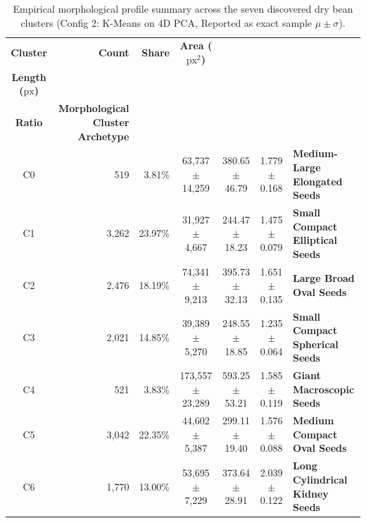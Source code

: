 \documentclass[10pt,onecolumn,letterpaper]{article}
\begin{document}
\begin{table}[htbp]
\centering
\footnotesize
\setlength{\tabcolsep}{3.5pt}
\renewcommand{\arraystretch}{1.1}
\begin{tabularx}{\textwidth}{c r r c c c X}
\toprule
\textbf{Cluster} & \textbf{Count} & \textbf{Share} & \textbf{Area ($\text{px}^2$)} & \makecell[c]{\textbf{Major Axis}\\\textbf{Length ($\text{px}$)}} & \makecell[c]{\textbf{Aspect}\\\textbf{Ratio}} & \textbf{Morphological Cluster Archetype} \\
\midrule
C0 & 519 & 3.81\% & 63,737 $\pm$ 14,259 & 380.65 $\pm$ 46.79 & 1.779 $\pm$ 0.168 & \textbf{Medium-Large Elongated Seeds} \\
C1 & 3,262 & 23.97\% & 31,927 $\pm$ 4,667 & 244.47 $\pm$ 18.23 & 1.475 $\pm$ 0.079 & \textbf{Small Compact Elliptical Seeds} \\
C2 & 2,476 & 18.19\% & 74,341 $\pm$ 9,213 & 395.73 $\pm$ 32.13 & 1.651 $\pm$ 0.135 & \textbf{Large Broad Oval Seeds} \\
C3 & 2,021 & 14.85\% & 39,389 $\pm$ 5,270 & 248.55 $\pm$ 18.85 & 1.235 $\pm$ 0.064 & \textbf{Small Compact Spherical Seeds} \\
C4 & 521 & 3.83\% & 173,557 $\pm$ 23,289 & 593.25 $\pm$ 53.21 & 1.585 $\pm$ 0.119 & \textbf{Giant Macroscopic Seeds} \\
C5 & 3,042 & 22.35\% & 44,602 $\pm$ 5,387 & 299.11 $\pm$ 19.40 & 1.576 $\pm$ 0.088 & \textbf{Medium Compact Oval Seeds} \\
C6 & 1,770 & 13.00\% & 53,695 $\pm$ 7,229 & 373.64 $\pm$ 28.91 & 2.039 $\pm$ 0.122 & \textbf{Long Cylindrical Kidney Seeds} \\
\bottomrule
\end{tabularx}
\caption{Empirical morphological profile summary across the seven discovered dry bean clusters (Config 2: K-Means on 4D PCA, Reported as exact sample $\mu \pm \sigma$).}
\label{tab:cluster_profiles}
\end{table}
\end{document}
